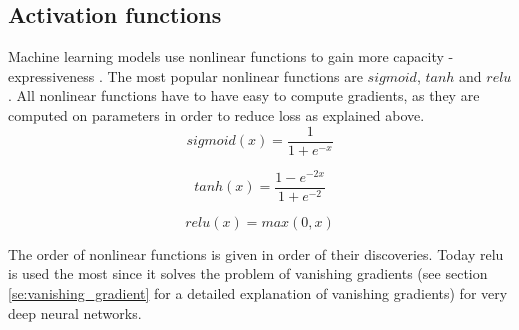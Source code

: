 \documentclass[times, utf8, diplomski]{fer}
\begin{document}
\subsection{Activation functions} \label{se:activation_functions}
Machine learning models use nonlinear functions to gain more capacity - expressiveness
. The most popular nonlinear functions are $sigmoid$, $tanh$ and $relu$. All nonlinear functions have to have easy to compute gradients, as they are computed on parameters in order to reduce loss as explained above. 
\begin{equation} \label{eq:sigmoid}
    sigmoid(x) = \frac{1}{1 + e^{-x}}
\end{equation}

\begin{equation} \label{eq:tanh}
    tanh(x) = \frac{1 - e^{-2x}}{1 + e^{-2}}
\end{equation}

\begin{equation} \label{eq:relu}
    relu(x) = max(0, x)
\end{equation}

The order of nonlinear functions is given in order of their discoveries. Today relu is used the most since it solves the problem of vanishing gradients (see section \ref{se:vanishing_gradient} for a detailed explanation of vanishing gradients) for very deep neural networks.
\end{document}
